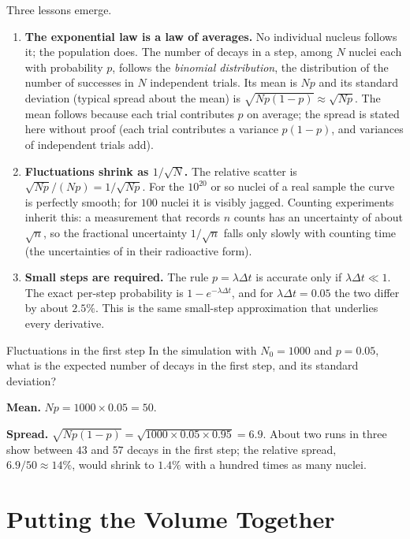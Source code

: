 Three lessons emerge.
\begin{enumerate}[label=(\roman*)]
\item \textbf{The exponential law is a law of averages.} No individual nucleus follows it; the population
does. The number of decays in a step, among $N$ nuclei each with probability $p$, follows the
\emph{binomial distribution}, the distribution of the number of successes in $N$ independent trials. Its
mean is $Np$ and its standard deviation (typical spread about the mean) is $\sqrt{Np(1-p)}\approx\sqrt{Np}$.
The mean follows because each trial contributes $p$ on average; the spread is stated here without proof
(each trial contributes a variance $p(1-p)$, and variances of independent trials add).
\item \textbf{Fluctuations shrink as $1/\sqrt{N}$.} The relative scatter is $\sqrt{Np}/(Np)=1/\sqrt{Np}$.
For the $10^{20}$ or so nuclei of a real sample the curve is perfectly smooth; for $100$ nuclei it is
visibly jagged. Counting experiments inherit this: a measurement that records $n$ counts has an
uncertainty of about $\sqrt n$, so the fractional uncertainty $1/\sqrt n$ falls only slowly with counting
time (the uncertainties of  in their radioactive form).
\item \textbf{Small steps are required.} The rule $p=\lambda\Delta t$ is accurate only if $\lambda\Delta t\ll1$.
The exact per-step probability is $1-e^{-\lambda\Delta t}$, and for $\lambda\Delta t=0.05$ the two differ by
about $2.5\%$. This is the same small-step approximation that underlies every derivative.
\end{enumerate}

\begin{exbox}{Fluctuations in the first step}\label{ex:nucapp-mcspread}
In the simulation with $N_0=1000$ and $p=0.05$, what is the expected number of decays in the first step,
and its standard deviation?

 \textbf{Mean.} $Np=1000\times0.05=50$.

 \textbf{Spread.} $\sqrt{Np(1-p)}=\sqrt{1000\times0.05\times0.95}=6.9$. About two runs in three show
between $43$ and $57$ decays in the first step; the relative spread, $6.9/50\approx14\%$, would shrink to
$1.4\%$ with a hundred times as many nuclei.
\end{exbox}

\section{Putting the Volume Together}\label{sec:nucapp-together}

